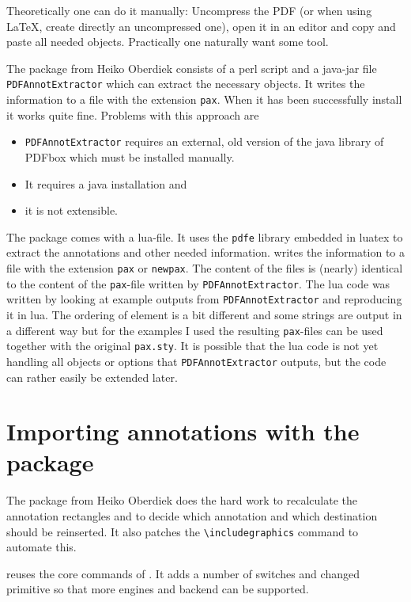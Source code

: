 \documentclass[DIV=12,parskip=half-,bibliography=totoc]{scrartcl}
\begin{document}
Theoretically one can do it manually: Uncompress the PDF (or when using \LaTeX, create directly an uncompressed one), open it in an editor and copy and paste all needed objects. Practically one naturally want some tool.

The  package from Heiko Oberdiek consists of a perl script and a java-jar file \texttt{PDFAnnotExtractor} which can extract the necessary objects. It writes the information to a file with the extension \texttt{pax}.
When it has been successfully install it works quite fine. Problems with this approach are
\begin{itemize}
\item \texttt{PDFAnnotExtractor} requires an external, old version of the java library of PDFbox which must be installed manually.
\item It requires a java installation and
\item it is not extensible.
\end{itemize}

The  package comes with a lua-file. It uses the \texttt{pdfe} library embedded in luatex to extract the annotations and other needed information.  writes the information to a file with the extension \texttt{pax} or \texttt{newpax}. The content of the files is (nearly) identical to the content of the \texttt{pax}-file written by \texttt{PDFAnnotExtractor}. The lua code was written by looking at example outputs from \texttt{PDFAnnotExtractor} and reproducing it in lua. The ordering of element is a bit different and some strings are output in a different way but for the examples I used the resulting \texttt{pax}-files can be used together with the original \texttt{pax.sty}. It is possible that the lua code is not yet handling all objects or options that \texttt{PDFAnnotExtractor} outputs, but the code can rather easily be extended later.


\section{Importing annotations with the  package}

The  package from Heiko Oberdiek does the hard work to recalculate the annotation rectangles and to decide which annotation and which destination should be reinserted. It also patches the \verb+\includegraphics+ command to automate this. 

 reuses the core commands of . It adds a number of switches and changed primitive so that more engines and backend can be supported.
\end{document}
